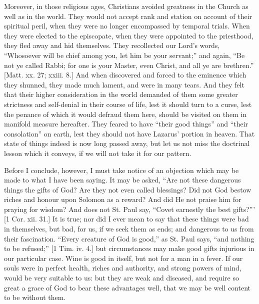 Moreover, in those religious ages, Christians avoided greatness in
the Church as well as in the world. They would not accept rank and
station on account of their spiritual peril, when they were no longer
encompassed by temporal trials. When they were elected to the
episcopate, when they were appointed to the priesthood, they fled away
and hid themselves. They recollected our Lord's words, ``Whosoever
will be chief among you, let him be your servant;'' and again,
``Be not ye called Rabbi; for one is your Master, even Christ, and
all ye are brethren.'' [Matt. xx. 27; xxiii. 8.] And when
discovered and forced to the eminence which they shunned, they made
much lament, and were in many tears. And they felt that their higher
consideration in the world demanded of them some greater strictness
and self-denial in their course of life, lest it should turn to a
curse, lest the penance of which it would defraud them here, should be
visited on them in manifold measure hereafter. They feared to have
``their good things'' and ``their consolation'' on
earth, lest they should not have Lazarus' portion in heaven. That
state of things indeed is now long passed away, but let us not miss
the doctrinal lesson which it conveys, if we will not take it for our
pattern.

Before I conclude, however, I must take notice of an objection
which may be made to what I have been saying. It may be asked,
``Are not these dangerous things the gifts of God? Are they not
even called blessings? Did not God bestow riches and honour upon
Solomon as a reward? And did He not praise him for praying for wisdom?
And does not St. Paul say, ``Covet earnestly the best
gifts?''' [1 Cor. xii. 31.] It is true; nor did I ever mean to say
that these things were bad in themselves, but bad, for us, if we seek
them as ends; and dangerous to us from their fascination. ``Every
creature of God is good,'' as St. Paul says, ``and nothing to
be refused;'' [1 Tim. iv. 4.] but circumstances may make good
gifts injurious in our particular case. Wine is good in itself, but
not for a man in a fever. If our souls were in perfect health, riches
and authority, and strong powers of mind, would be very suitable to
us: but they are weak and diseased, and require so great a grace of
God to bear these advantages well, that we may be well content to be
without them.

